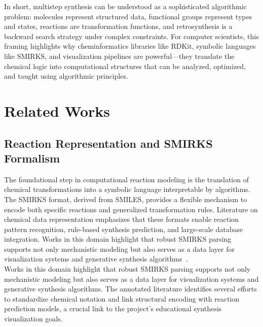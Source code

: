 \documentclass[12pt]{article}
\begin{document}
\indent
In short, multistep synthesis can be understood as a sophisticated algorithmic problem: molecules represent structured data, functional groups represent types and states, reactions are transformation functions, and retrosynthesis is a backward search strategy under complex constraints.
For computer scientists, this framing highlights why cheminformatics libraries like RDKit, symbolic languages like SMIRKS, and visualization pipelines are powerful—they translate the chemical logic into computational structures that can be analyzed, optimized, and taught using algorithmic principles.
\\

    
\section{Related Works}
\subsection{Reaction Representation and SMIRKS Formalism}
\indent
The foundational step in computational reaction modeling is the translation of chemical transformations into a symbolic language interpretable by algorithms.
The SMIRKS format, derived from SMILES, provides a flexible mechanism to encode both specific reactions and generalized transformation rules.
Literature on chemical data representation emphasizes that these formats enable reaction pattern recognition, rule-based synthesis prediction, and large-scale database integration.
Works in this domain highlight that robust SMIRKS parsing supports not only mechanistic modeling but also serves as a data layer for visualization systems and generative synthesis algorithms~\cite{10.1002/ail2.91}.
\\
\indent
Works in this domain highlight that robust SMIRKS parsing supports not only mechanistic modeling but also serves as a data layer for visualization systems and generative synthesis algorithms.
The annotated literature identifies several efforts to standardize chemical notation and link structural encoding with reaction prediction models, a crucial link to the project’s educational synthesis visualization goals.
\end{document}
